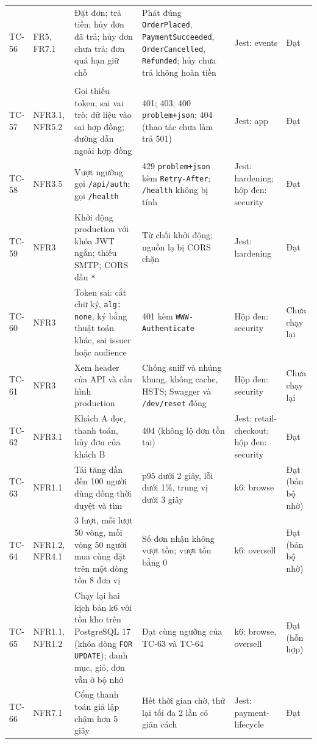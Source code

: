 \begin{longtable}{L{1.40cm} L{1.55cm} L{4.00cm} L{4.05cm} L{1.95cm} L{1.95cm}}
TC-56 & FR5, FR7.1 & Đặt đơn; trả tiền; hủy đơn đã trả; hủy đơn chưa trả; đơn quá hạn giữ chỗ & Phát đúng \texttt{OrderPlaced}, \texttt{PaymentSucceeded}, \texttt{OrderCancelled}, \texttt{Refunded}; hủy chưa trả không hoàn tiền & Jest: events & Đạt \\
 \\
TC-57 & NFR3.1, NFR5.2 & Gọi thiếu token; sai vai trò; dữ liệu vào sai hợp đồng; đường dẫn ngoài hợp đồng & 401; 403; 400 \texttt{problem+json}; 404 (thao tác chưa làm trả 501) & Jest: app & Đạt \\
TC-58 & NFR3.5 & Vượt ngưỡng gọi \texttt{/api/auth}; gọi \texttt{/health} & 429 \texttt{problem+json} kèm \texttt{Retry-After}; \texttt{/health} không bị tính & Jest: hardening; hộp đen: security & Đạt \\
TC-59 & NFR3 & Khởi động production với khóa JWT ngắn; thiếu SMTP; CORS dấu \texttt{*} & Từ chối khởi động; nguồn lạ bị CORS chặn & Jest: hardening & Đạt \\
TC-60 & NFR3 & Token sai: cắt chữ ký, \texttt{alg: none}, ký bằng thuật toán khác, sai issuer hoặc audience & 401 kèm \texttt{WWW-Authenticate} & Hộp đen: security & Chưa chạy lại \\
TC-61 & NFR3 & Xem header của API và cấu hình production & Chống sniff và nhúng khung, không cache, HSTS; Swagger và \texttt{/dev/reset} đóng & Hộp đen: security & Chưa chạy lại \\
TC-62 & NFR3.1 & Khách A đọc, thanh toán, hủy đơn của khách B & 404 (không lộ đơn tồn tại) & Jest: retail-checkout; hộp đen: security & Đạt \\
TC-63 & NFR1.1 & Tải tăng dần đến 100 người dùng đồng thời duyệt và tìm & p95 dưới 2 giây, lỗi dưới 1\%, trung vị dưới 3 giây & k6: browse & Đạt (bản bộ nhớ) \\
TC-64 & NFR1.2, NFR4.1 & 3 lượt, mỗi lượt 50 vòng, mỗi vòng 50 người mua cùng đặt trên một dòng tồn 8 đơn vị & Số đơn nhận không vượt tồn; vượt tồn bằng 0 & k6: oversell & Đạt (bản bộ nhớ) \\
TC-65 & NFR1.1, NFR1.2 & Chạy lại hai kịch bản k6 với tồn kho trên PostgreSQL 17 (khóa dòng \texttt{FOR UPDATE}); danh mục, giỏ, đơn vẫn ở bộ nhớ & Đạt cùng ngưỡng của TC-63 và TC-64 & k6: browse, oversell & Đạt (hỗn hợp) \\
TC-66 & NFR7.1 & Cổng thanh toán giả lập chậm hơn 5 giây & Hết thời gian chờ, thử lại tối đa 2 lần có giãn cách & Jest: payment-lifecycle & Đạt \\

\end{longtable}
